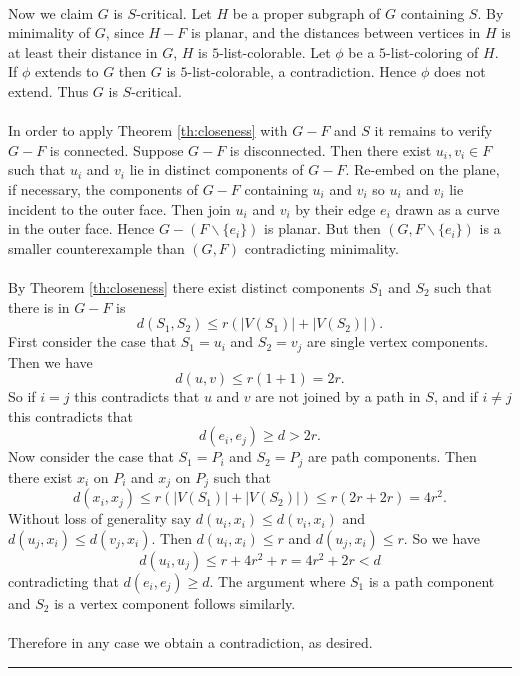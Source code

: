 \documentclass[letterpaper,12pt,oneside,onecolumn]{article}
\newenvironment{proof}{{\bf Proof:  }}{\hfill\rule{2mm}{2mm}}
\begin{document}
\begin{proof}
\paragraph{}
Now we claim $G$ is $S$-critical. Let $H$ be a proper subgraph of $G$ containing $S$. By minimality of $G$, since $H-F$ is planar, and the distances between vertices in $H$ is at least their distance in $G$, $H$ is $5$-list-colorable. Let $\phi$ be a $5$-list-coloring of $H$. If $\phi$ extends to $G$ then $G$ is $5$-list-colorable, a contradiction. Hence $\phi$ does not extend. Thus $G$ is $S$-critical.
\paragraph{}
In order to apply Theorem \ref{th:closeness} with $G-F$ and $S$ it remains to verify $G-F$ is connected. Suppose $G-F$ is disconnected. Then there exist  $u_i,v_i \in F$ such that $u_i$ and $v_i$ lie in distinct components of $G-F$. Re-embed on the plane, if necessary, the components of $G-F$ containing $u_i$ and $v_i$ so $u_i$ and $v_i$ lie incident to the outer face. Then join $u_i$ and $v_i$ by their edge $e_i$ drawn as a curve in the outer face. Hence $G - (F\backslash \{e_i\})$ is planar. But then $(G, F\backslash\{e_i\})$ is a smaller counterexample than $(G,F)$ contradicting minimality.
\paragraph{}
By Theorem \ref{th:closeness} there exist distinct components $S_1$ and $S_2$ such that there is in $G-F$ is
$$d(S_1,S_2) \leq r(|V(S_1)| + |V(S_2)|).$$
First consider the case that $S_1 = u_i$ and $S_2=v_j$ are single vertex components. Then we have
$$d(u,v) \leq r(1+1) = 2r.$$
So if $i=j$ this contradicts that $u$ and $v$ are not joined by a path in $S$, and if $i\neq j$ this contradicts that
$$d(e_i,e_j) \geq d > 2r.$$
Now consider the case that $S_1 =P_i$ and $S_2 = P_j$ are path components. Then there exist $x_i$ on $P_i$ and $x_j$ on $P_j$ such that
$$d(x_i, x_j) \leq r(|V(S_1)| + |V(S_2)|) \leq r(2r + 2r) = 4r^2.$$
Without loss of generality say $d(u_i,x_i) \leq d(v_i,x_i)$ and $d(u_j, x_i) \leq d(v_j, x_i)$. Then $d(u_i, x_i) \leq r$ and $d(u_j,x_i) \leq r$. So we have
$$d(u_i,u_j) \leq r + 4r^2 + r = 4r^2 + 2r < d$$
contradicting that $d(e_i,e_j) \geq d.$ The argument where $S_1$ is a path component and $S_2$ is a vertex component follows similarly.
\paragraph{}
Therefore in any case we obtain a contradiction, as desired.
\end{proof}
\end{document}
